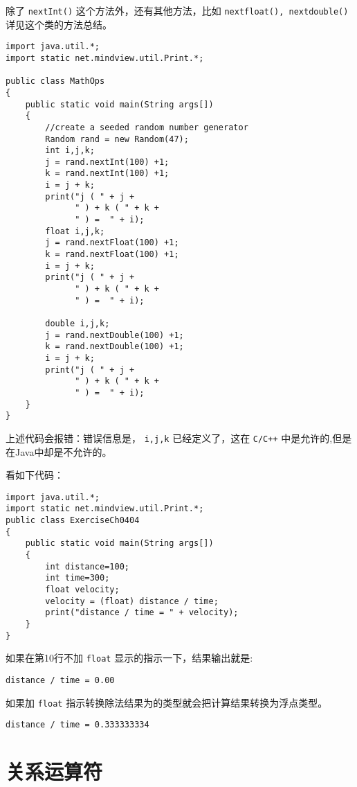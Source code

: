 \documentclass[10pt,a4paper,UTF8]{article}
\begin{document}
除了 \texttt{nextInt()} 这个方法外，还有其他方法，比如 \texttt{nextfloat(), nextdouble()}  详见这个类的方法总结。

\lstset{language=java,label= ,caption= ,captionpos=b,firstnumber=1,numbers=left}
\begin{lstlisting}
import java.util.*;
import static net.mindview.util.Print.*;

public class MathOps
{
    public static void main(String args[])
    {
        //create a seeded random number generator
        Random rand = new Random(47);
        int i,j,k;
        j = rand.nextInt(100) +1;
        k = rand.nextInt(100) +1;
        i = j + k;
        print("j ( " + j +
              " ) + k ( " + k +
              " ) =  " + i);
        float i,j,k; 
        j = rand.nextFloat(100) +1;
        k = rand.nextFloat(100) +1;
        i = j + k;
        print("j ( " + j +
              " ) + k ( " + k +
              " ) =  " + i);

        double i,j,k; 
        j = rand.nextDouble(100) +1;
        k = rand.nextDouble(100) +1;
        i = j + k;
        print("j ( " + j +
              " ) + k ( " + k +
              " ) =  " + i);
    }
}
\end{lstlisting}
上述代码会报错：错误信息是， \texttt{i,j,k} 已经定义了，这在 \texttt{C/C++} 中是允许的,但是在Java中却是不允许的。

看如下代码：
\lstset{language=java,label= ,caption= ,captionpos=b,firstnumber=1,numbers=left}
\begin{lstlisting}
import java.util.*;
import static net.mindview.util.Print.*;
public class ExerciseCh0404
{
    public static void main(String args[])
    {
        int distance=100;
        int time=300;
        float velocity;
        velocity = (float) distance / time;
        print("distance / time = " + velocity);
    }
}
\end{lstlisting}
如果在第10行不加 \texttt{float} 显示的指示一下，结果输出就是:
\begin{verbatim}
distance / time = 0.00
\end{verbatim}
如果加 \texttt{float} 指示转换除法结果为的类型就会把计算结果转换为浮点类型。
\begin{verbatim}
distance / time = 0.333333334
\end{verbatim}
\section{关系运算符}
\label{sec:orgheadline3}
\end{document}
